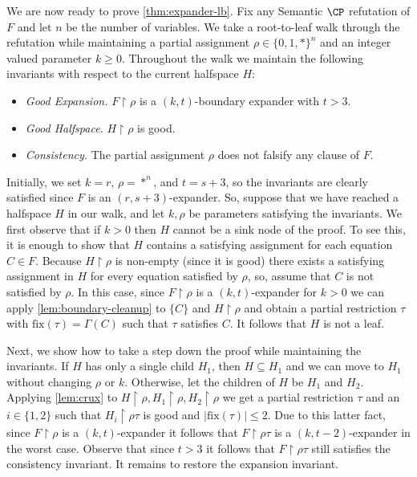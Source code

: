 \documentclass[11pt]{article}
\numberwithin{equation}{section}
\theoremstyle{definition}
\theoremstyle{plain}
\newcommand{\set}[1]{\{ #1 \}}
\renewcommand{\restriction}{\!\!\upharpoonright}
\newcommand{\fix}{\ensuremath{\mathrm{fix}}}
\renewcommand{\restriction}{\!\ensuremath{\upharpoonright}\!}
\begin{document}
	We are now ready to prove \autoref{thm:expander-lb}.
	Fix any Semantic $\CP$ refutation of $F$ and let $n$ be the number of variables.
	We take a root-to-leaf walk through the refutation while maintaining a partial assignment $\rho \in \set{0,1,*}^n$ and an integer valued parameter $k \geq 0$.
	Throughout the walk we maintain the following invariants with respect to the current halfspace $H$: 
	\begin{itemize}
		\item[--] \emph{Good Expansion.} $F \restriction \rho$ is a $(k, t)$-boundary expander with $t > 3$.
		\item[--] \emph{Good Halfspace.} $H \restriction \rho$ is good.
		\item[--] \emph{Consistency.} The partial assignment $\rho$ does not falsify any clause of $F$.
	\end{itemize}
	
	Initially, we set $k = r$, $\rho = *^n$, and $t=s+3$, so the invariants are clearly satisfied since $F$ is an $(r, s+3)$-expander.
	So, suppose that we have reached a halfspace $H$ in our walk, and let $k, \rho$ be parameters satisfying the invariants.
	We first observe that if $k > 0$ then $H$ cannot be a sink node of the proof.
	To see this, it is enough to show that $H$ contains a satisfying assignment for each equation $C \in F$. 
	Because $H \restriction \rho$ is non-empty (since it is good) there exists a satisfying assignment in $H$ for every equation satisfied by $\rho$, so, 	assume that $C$ is not satisfied by $\rho$. 
	In this case, since $F \restriction \rho$ is a $(k, t)$-expander for $k>0$ we can apply \autoref{lem:boundary-cleanup} to $\set{C}$ and $H \restriction \rho$ and obtain a partial restriction $\tau$ with $\fix(\tau) = \Gamma(C)$ such that $\tau$ satisfies $C$.
	It follows that $H$ is not a leaf.

	Next, we show how to take a step down the proof while maintaining the invariants. 
	If $H$ has only a single child $H_1$, then $H \subseteq H_1$ and we can move to $H_1$ without changing $\rho$ or $k$.
	Otherwise, let the children of $H$ be $H_1$ and $H_2$. 
	Applying \autoref{lem:crux} to $H \restriction \rho, H_1 \restriction \rho, H_2 \restriction \rho$ we get a partial restriction $\tau$ and an $i \in \set{1,2}$ such that $H_i \restriction \rho\tau$ is good and $|\fix(\tau)| \leq 2$.
	Due to this latter fact, since $F \restriction \rho$ is a $(k, t)$-expander it follows that $F \restriction \rho\tau$ is a $(k, t-2)$-expander in the worst case.
	Observe that since $t > 3$ it follows that $F \restriction \rho\tau$ still satisfies the consistency invariant.
	It remains to restore the expansion invariant.
\end{document}
